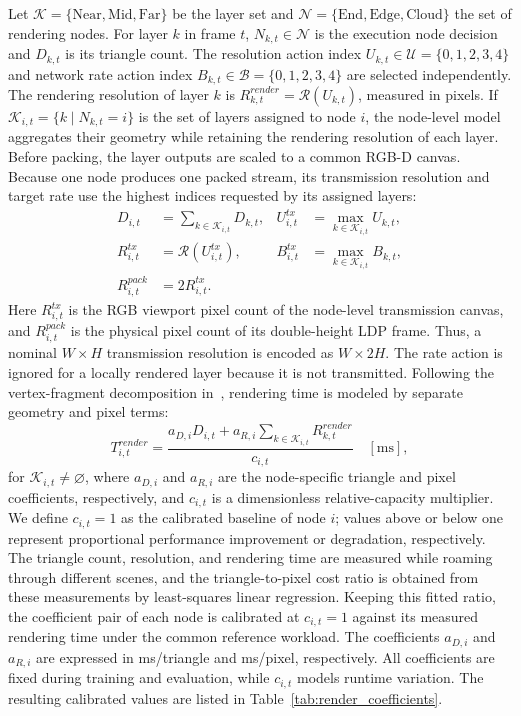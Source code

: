 \documentclass[10pt,journal,compsoc]{IEEEtran}
\begin{document}
Let $\mathcal{K}=\{\mathrm{Near},\mathrm{Mid},\mathrm{Far}\}$ be the layer set and $\mathcal{N}=\{\mathrm{End},\mathrm{Edge},\mathrm{Cloud}\}$ the set of rendering nodes. For layer $k$ in frame $t$, $N_{k,t}\in\mathcal{N}$ is the execution node decision and $D_{k,t}$ is its triangle count. The resolution action index $U_{k,t}\in\mathcal{U}=\{0,1,2,3,4\}$ and network rate action index $B_{k,t}\in\mathcal{B}=\{0,1,2,3,4\}$ are selected independently. The rendering resolution of layer $k$ is $R^{render}_{k,t}=\mathcal{R}(U_{k,t})$, measured in pixels. If $\mathcal{K}_{i,t}=\{k\mid N_{k,t}=i\}$ is the set of layers assigned to node $i$, the node-level model aggregates their geometry while retaining the rendering resolution of each layer. Before packing, the layer outputs are scaled to a common RGB-D canvas. Because one node produces one packed stream, its transmission resolution and target rate use the highest indices requested by its assigned layers:
\begin{align}
	D_{i,t}&=\sum_{k\in\mathcal{K}_{i,t}}D_{k,t}, &
	U^{tx}_{i,t}&=\max_{k\in\mathcal{K}_{i,t}}U_{k,t},\\
	R^{tx}_{i,t}&=\mathcal{R}(U^{tx}_{i,t}), &
	B^{tx}_{i,t}&=\max_{k\in\mathcal{K}_{i,t}}B_{k,t},\\
	R^{pack}_{i,t}&=2R^{tx}_{i,t}.
\end{align}
Here $R^{tx}_{i,t}$ is the RGB viewport pixel count of the node-level transmission canvas, and $R^{pack}_{i,t}$ is the physical pixel count of its double-height LDP frame. Thus, a nominal $W\times H$ transmission resolution is encoded as $W\times2H$. The rate action is ignored for a locally rendered layer because it is not transmitted. Following the vertex-fragment decomposition in~\cite{xu_wireless_2025}, rendering time is modeled by separate geometry and pixel terms:
\begin{equation}
	T^{render}_{i,t}=
	\frac{a_{D,i}D_{i,t}+a_{R,i}
	\sum_{k\in\mathcal{K}_{i,t}}R^{render}_{k,t}}{c_{i,t}}
	\quad [\mathrm{ms}],
	\label{eq:render_time}
\end{equation}
for $\mathcal{K}_{i,t}\ne\varnothing$, where $a_{D,i}$ and $a_{R,i}$ are the node-specific triangle and pixel coefficients, respectively, and $c_{i,t}$ is a dimensionless relative-capacity multiplier. We define $c_{i,t}=1$ as the calibrated baseline of node $i$; values above or below one represent proportional performance improvement or degradation, respectively. The triangle count, resolution, and rendering time are measured while roaming through different scenes, and the triangle-to-pixel cost ratio is obtained from these measurements by least-squares linear regression. Keeping this fitted ratio, the coefficient pair of each node is calibrated at $c_{i,t}=1$ against its measured rendering time under the common reference workload. The coefficients $a_{D,i}$ and $a_{R,i}$ are expressed in ms/triangle and ms/pixel, respectively. All coefficients are fixed during training and evaluation, while $c_{i,t}$ models runtime variation. The resulting calibrated values are listed in Table~\ref{tab:render_coefficients}.
\end{document}
